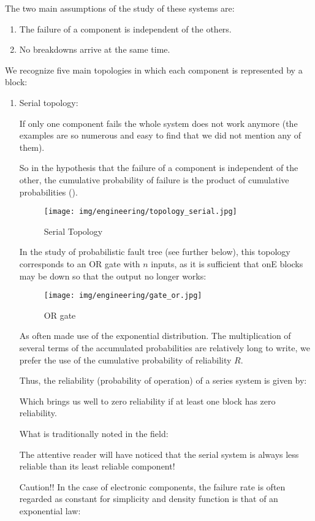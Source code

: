 	The two main assumptions of the study of these systems are:
	\begin{enumerate}
		\item The failure of a component is independent of the  others.
		\item No breakdowns arrive at the same time.	
	\end{enumerate}
	We recognize five main topologies in which each component is represented by a block:
	\begin{enumerate}
		\item Serial topology:
		
		If only one component fails the whole system does not work anymore (the examples are so numerous and easy to find that we did not mention any of them).
		
		So in the hypothesis that the failure of a component is independent of the other, the cumulative probability of failure is the product of cumulative probabilities ().
		\begin{figure}[H]
			\begin{center}
				\texttt{[image: img/engineering/topology\_serial.jpg]}
			\end{center}	
			\caption{Serial Topology}
		\end{figure}
		In the study of probabilistic fault tree (see further below), this topology corresponds to an OR gate with $n$ inputs, as it is sufficient that onE blocks may be down so that the output no longer works:
		\begin{figure}[H]
			\begin{center}
				\texttt{[image: img/engineering/gate\_or.jpg]}
			\end{center}	
			\caption{OR gate}
		\end{figure}
		As often made use of the exponential distribution. The multiplication of several terms of the accumulated probabilities are relatively long to write, we prefer the use of the cumulative probability of reliability $R$.
		
		Thus, the reliability (probability of operation) of a series system is given by:
		
		Which brings us well to zero reliability if at least one block has zero reliability.
		
		What is traditionally noted in the field:
		
		\begin{tcolorbox}[title=Remark,colframe=black,arc=10pt]
		The attentive reader will have noticed that the serial system is always less reliable than its least reliable component!
		\end{tcolorbox}	
		Caution!! In the case of electronic components, the failure rate is often regarded as constant for simplicity and density function is that of an exponential law:
		

\end{enumerate}
